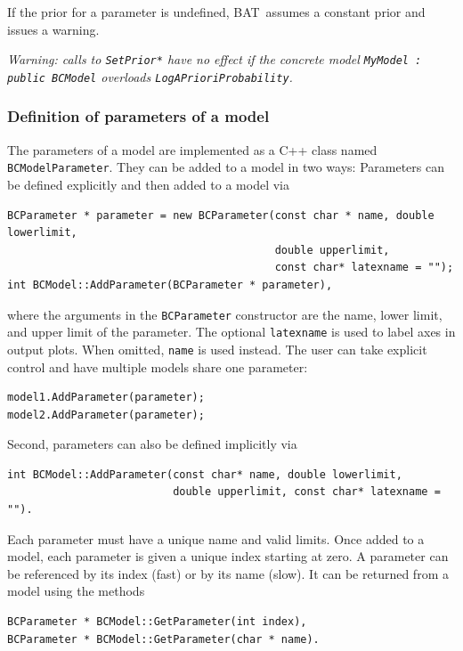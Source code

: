 \documentclass[11pt, a4paper]{article}
\newcommand{\bat}{{\sc BAT}}
\newcommand{\code}[1]{\texttt{#1}}
\begin{document}
If the prior for a parameter is undefined, \bat\ assumes a constant
prior and issues a warning.

\emph{Warning: calls to \emph{\texttt{SetPrior*}} have no effect if
  the concrete model \emph{\texttt{MyModel : public BCModel}}
  overloads \emph{\texttt{LogAPrioriProbability}}.}


\subsubsection{Definition of parameters of a model}
\label{subsubsection:parameters}

The parameters of a model are implemented as a C++ class named
\verb|BCModelParameter|. They can be added to a model in two ways:
Parameters can be defined explicitly and then added to a model via
%
\begin{verbatim}
BCParameter * parameter = new BCParameter(const char * name, double lowerlimit,
                                          double upperlimit,
                                          const char* latexname = "");
int BCModel::AddParameter(BCParameter * parameter),
\end{verbatim}
%
where the arguments in the \code{BCParameter} constructor are the
name, lower limit, and upper limit of the parameter. The optional
\verb|latexname| is used to label axes in output plots. When omitted,
\verb|name| is used instead. The user can take explicit control and
have multiple models share one parameter:
\begin{verbatim}
model1.AddParameter(parameter);
model2.AddParameter(parameter);
\end{verbatim}

Second, parameters can also be defined implicitly via
%
\begin{verbatim}
int BCModel::AddParameter(const char* name, double lowerlimit,
                          double upperlimit, const char* latexname = "").
\end{verbatim}

Each parameter must have a unique name and valid limits. Once added to
a model, each parameter is given a unique index starting at zero. A
parameter can be referenced by its index (fast) or by its name
(slow). It can be returned from a model using the methods
%
\begin{verbatim}
BCParameter * BCModel::GetParameter(int index),
BCParameter * BCModel::GetParameter(char * name).
\end{verbatim}
\end{document}
